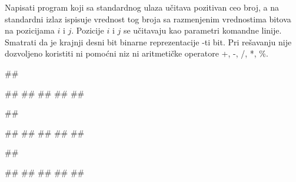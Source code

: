 \begin{Exercise}[label=1_13]%
Napisati program koji sa standardnog ulaza učitava pozitivan ceo broj, a na standardni izlaz ispisuje vrednost tog broja sa razmenjenim vrednostima bitova na pozicijama $i$ i $j$. Pozicije $i$ i $j$ se učitavaju kao parametri
  komandne linije. Smatrati da je krajnji desni bit binarne
  reprezentacije -ti bit. Pri rešavanju nije dozvoljeno koristiti
  ni pomoćni niz ni aritmetičke operatore +, -, /, *, \%.

\begin{minitest}
\begin{upotreba}{1}
##

#\naslovInt#
#\naslovUlaz#
##
#\naslovIzlaz#
##
\end{upotreba}
\end{minitest}
\begin{minitest}
\begin{upotreba}{2}
##

#\naslovInt#
#\naslovUlaz#
##
#\naslovIzlaz#
##
\end{upotreba}
\end{minitest}
\begin{minitest}
\begin{upotreba}{2}
##

#\naslovInt#
#\naslovUlaz#
##
#\naslovIzlaz#
##
\end{upotreba}
\end{minitest}

\end{Exercise}

